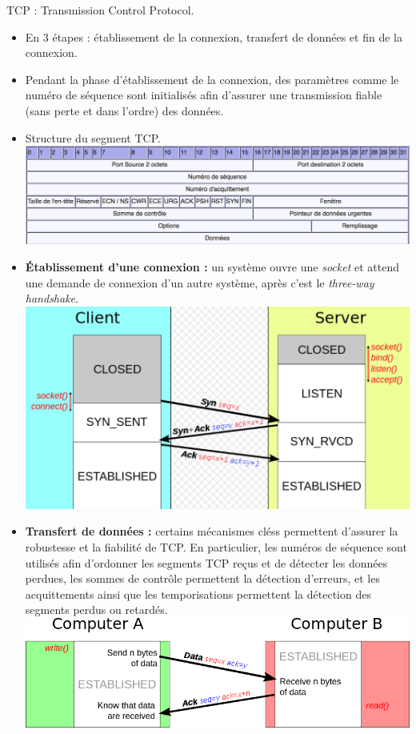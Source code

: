 \documentclass[a4paper,9pt, twocolumn]{article}
\begin{document}
	TCP : Transmission Control Protocol.
	\begin{itemize}
		\item En 3 étapes : établissement de la connexion, transfert de données et fin de la connexion.
		\item Pendant la phase d'établissement de la connexion, des paramètres comme le numéro de séquence sont initialisés afin d'assurer une transmission fiable (sans perte et dans l'ordre) des données.
		\item Structure du segment TCP.
		\includegraphics[scale=0.28]{tc.png}
		\item \textbf{Établissement d'une connexion :} un système ouvre une \emph{socket} et attend une demande de connexion d'un autre système, après c'est le \emph{three-way handshake}.
			\includegraphics[scale=0.27]{hand.png}
		\item \textbf{Transfert de données :}
			certains mécanismes cléss permettent d'assurer la robustesse et la fiabilité de TCP.
			En particulier, les numéros de séquence sont utilisés afin d'ordonner les segments TCP reçus et de détecter les données perdues, les sommes de contrôle permettent la détection d'erreurs, et les acquittements ainsi que les temporisations permettent la détection des segments perdus ou retardés.
			\includegraphics[scale=0.28]{trans.png}

\end{itemize}
\end{document}
